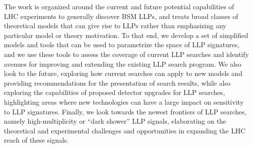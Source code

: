 The work is organized around the current and future potential capabilities of LHC experiments to generally discover BSM LLPs, and treats broad classes of theoretical models that can give rise to LLPs rather than emphasizing any particular model or theory motivation.
To that end, we develop a set of simplified models and tools that can be used to parametrize the space of LLP signatures, and we use these tools to assess the coverage of current LLP searches and identify avenues for improving and extending the existing LLP search program.
We also look to the future, exploring how current searches can apply to new models and providing recommendations for the presentation of search results, while also exploring the capabilities of proposed detector upgrades for LLP searches, highlighting areas where new technologies can have a large impact on sensitivity to LLP signatures.
Finally, we look towards the newest frontiers of LLP searches, namely high-multiplicity or ``dark shower'' LLP signals, elaborating on the theoretical and experimental challenges and opportunities in expanding the LHC reach of these signals.
